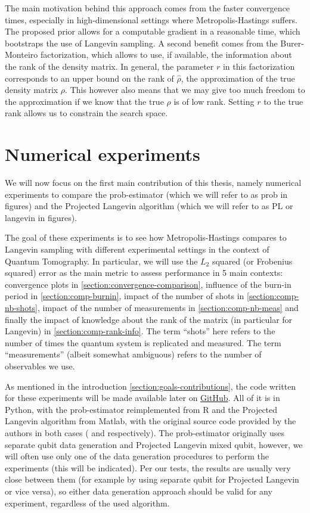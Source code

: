 \documentclass[12pt]{memoir}
\begin{document}
The main motivation behind this approach comes from the faster convergence times, especially in high-dimensional settings where Metropolis-Hastings suffers. The proposed prior allows for a computable gradient in a reasonable time, which bootstraps the use of Langevin sampling. A second benefit comes from the Burer-Monteiro factorization, which allows to use, if available, the information about the rank of the density matrix. In general, the parameter $r$ in this factorization corresponds to an upper bound on the rank of $\hat \rho$, the approximation of the true density matrix $\rho$. This however also means that we may give too much freedom to the approximation if we know that the true $\rho$ is of low rank. Setting $r$ to the true rank allows us to constrain the search space.\medbreak




\chapter{Numerical experiments}\label{section:numerical-exp}

We will now focus on the first main contribution of this thesis, namely numerical experiments to compare the prob-estimator (which we will refer to as prob in figures) and the Projected Langevin algorithm (which we will refer to as PL or langevin in figures).\medbreak


The goal of these experiments is to see how  Metropolis-Hastings compares to Langevin sampling with different experimental settings in the context of Quantum Tomography. In particular, we will use the $L_2$ squared (or Frobenius squared) error as the main metric to assess performance in 5 main contexts: convergence plots in \ref{section:convergence-comparison}, influence of the burn-in period in \ref{section:comp-burnin}, impact of the number of shots in \ref{section:comp-nb-shots}, impact of the number of measurements in \ref{section:comp-nb-meas} and finally the impact of knowledge about the rank of the matrix (in particular for Langevin) in \ref{section:comp-rank-info}. The term ``shots'' here refers to the number of times the quantum system is replicated and measured. The term ``measurements'' (albeit somewhat ambiguous) refers to the number of observables we use. \medbreak


As mentioned in the introduction \ref{section:goals-contributions}, the code written for these experiments will be made available later on \href{https://github.com/daqwes/thesis}{GitHub}. All of it is in Python, with the prob-estimator reimplemented from R and the Projected Langevin algorithm from Matlab, with the original source code provided by the authors in both cases (\cite{MA17} and \cite{meth:bayesian:Langevin:ACMT2024} respectively). The prob-estimator originally uses separate qubit data generation and Projected Langevin mixed qubit, however, we will often use only one of the data generation procedures to perform the experiments (this will be indicated). Per our tests, the results are usually very close between them (for example by using separate qubit for Projected Langevin or vice versa), so either data generation approach should be valid for any experiment, regardless of the used algorithm.\medbreak
\end{document}
